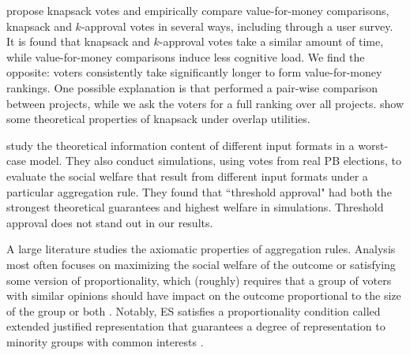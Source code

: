 \documentclass[runningheads]{llncs}
\newcommand{\kibitz}[2]{\ifnum\Comments=1{\color{#1}{#2}}\fi}
\newcommand{\kg}[1]{\kibitz{red}{[Kobi says:#1]}}
\newcommand{\gb}[1]{\kibitz{brown}{[GB:#1]}}
\newcommand{\mes}{ES}
\begin{document}
\citet{goel2019knapsack} propose knapsack votes and empirically compare       value-for-money comparisons, knapsack and $k$-approval votes in several ways, including through a user survey. It is found that knapsack and $k$-approval votes take a similar amount of time, while value-for-money comparisons induce less cognitive load.  We find the opposite: voters consistently take significantly longer to  form value-for-money rankings. One possible explanation is that \citet{goel2019knapsack} performed a pair-wise comparison between projects, while we ask the voters for a full ranking over all projects. \citet{goel2019knapsack}   show some theoretical properties of knapsack under overlap utilities. 

\citet{benade2021preference}  study the theoretical information content of different input formats in a worst-case model.
They also conduct simulations, using votes from real PB elections,  to evaluate the social welfare that result from different input formats under a particular aggregation rule. They found that ``threshold approval" had both the strongest theoretical guarantees and highest welfare in simulations. %
Threshold approval does not stand out in our results.
% 

A large literature studies the axiomatic properties of aggregation rules. Analysis most often focuses on maximizing the social welfare of the outcome \cite{benade2021preference,goel2019knapsack,jain2020participatory,hershkowitz2021district,talmon2019framework} \gb{other papers that maximize welfare?} %
or satisfying some version of proportionality, which (roughly) requires that a group of voters  with similar opinions should have impact on the outcome proportional to the size of the group \cite{fain2016core,  aziz2017justified, sanchez2017proportional, fain2018fair, aziz2018proportionally, skowron2020participatory, peters2021proportional} or both \cite{fairstein2022welfare,michorzewski2020price}.  Notably, \mes{} satisfies a proportionality condition called extended justified representation that guarantees a degree of representation to minority groups with common interests \citep{PS20}. 
\end{document}
